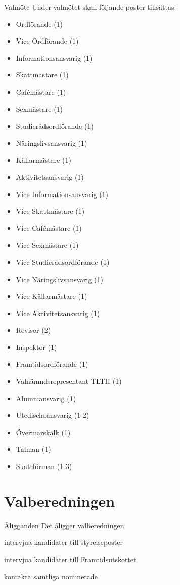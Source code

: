 \documentclass[pdfbookmarks,a4paper,11pt]{article}
\newlength{\itemcollength}
\newenvironment{reglemlista}{%
  \begin{list}{}{%
      \setlength{\labelwidth}{\itemcollength}%
      \setlength{\leftmargin}{\labelwidth + \labelsep}%
      \renewcommand{\makelabel}[1]{%
        \raisebox{0pt}[1ex][0pt]{%
          \makebox[\labelwidth][l]{%
            \parbox[t]{\itemcollength}{%
              \raggedright\hspace{0pt}##1}}}\hfill}%
      }}{%
  \end{list}}
\begin{document}
\begin{reglemlista}
	\item[Valmöte]
	Under valmötet skall följande poster tillsättas:
	\begin{itemize}
		\item Ordförande (1)
		\item Vice Ordförande (1)
		\item Informationsansvarig (1)
		\item Skattmästare (1)
		\item Cafémästare (1)
		\item Sexmästare (1)
		\item Studierådsordförande (1)
		\item Näringslivsansvarig (1)
		\item Källarmästare (1)
		\item Aktivitetsansvarig (1)
		\item Vice Informationsansvarig (1)
		\item Vice Skattmästare (1)
		\item Vice Cafémästare (1)
		\item Vice Sexmästare (1)
		\item Vice Studierådsordförande (1)
		\item Vice Näringslivsansvarig (1)
		\item Vice Källarmästare (1)
		\item Vice Aktivitetsansvarig (1)
		\item Revisor (2)
		\item Inspektor (1)
		\item Framtidsordförande (1)
		\item Valnämndsrepresentant TLTH (1)
		\item Alumniansvarig (1)
		\item Utedischoansvarig (1-2)
		\item Övermarskalk (1)
		\item Talman (1)
		\item Skattförman (1-3)
	\end{itemize}

\end{reglemlista}

\section{Valberedningen}

\begin{reglemlista}

	\item[Åligganden]
	Det åligger valberedningen
	\begin{attlista}
		\item intervjua kandidater till styrelseposter
		\item intervjua kandidater till Framtidsutskottet
		\item kontakta samtliga nominerade
	\end{attlista}

\end{reglemlista}
\end{document}
